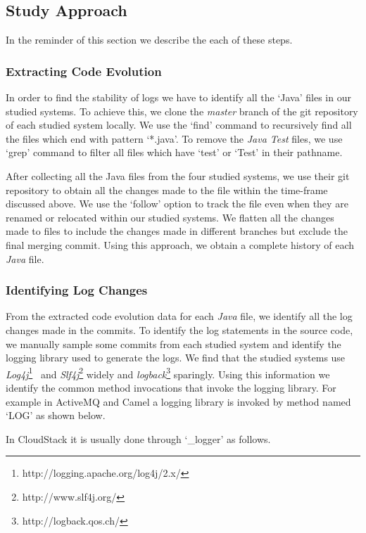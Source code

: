 \subsection{Study Approach}

 In the reminder of this section we describe the each of these steps.

\subsubsection{Extracting Code Evolution}
In order to find the stability of logs we have to identify all the `Java' files in our studied systems. To achieve this, we clone the \emph{master} branch of the git repository of each studied system locally. We use the `find' command to recursively find all the files which end with pattern `*.java'. To remove the \textsl{Java Test} files, we use `grep' command to filter all files which have `test' or `Test' in their pathname.

 After collecting all the Java files from the four studied systems, we use their git repository to obtain all the changes made to the file within the time-frame discussed above. We use the `follow' option to track the file even when they are renamed or relocated within our studied systems. We flatten all the changes made to files to include the changes made in different branches but exclude the final merging commit. Using this approach, we obtain a complete history of each \emph{Java} file. 

\subsubsection{Identifying Log Changes}
From the extracted code evolution data for each \emph{Java} file, we identify all the log changes made in the commits. To identify the log statements in the source code, we manually sample some commits from each studied system and identify the logging library used to generate the logs. We find that the studied systems use \textsl{Log4j}\footnote{http://logging.apache.org/log4j/2.x/}~\cite{EMSEIAN} and \textsl{Slf4j}\footnote{http://www.slf4j.org/} widely and \textsl{logback}\footnote{http://logback.qos.ch/} sparingly. Using this information we identify the common method invocations that invoke the logging library. For example in  ActiveMQ and Camel a logging library is invoked by method named `LOG' as shown below.

In CloudStack it is usually done through `\_logger' as follows.

